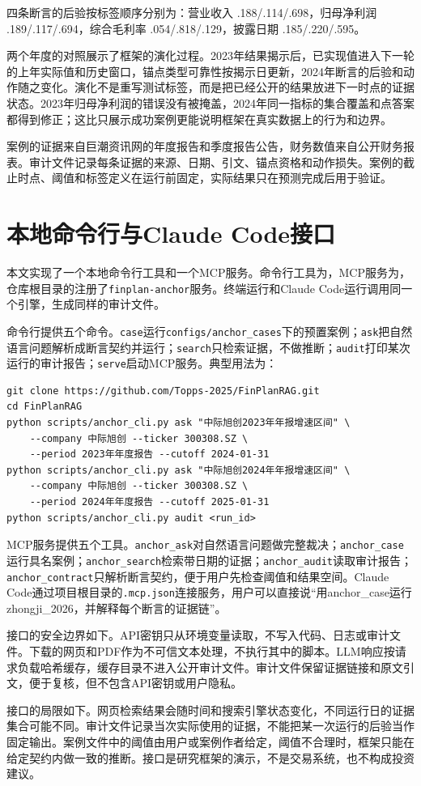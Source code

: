 {\sloppy 四条断言的后验按标签顺序分别为：营业收入 .188/.114/.698，归母净利润 .189/.117/.694，综合毛利率 .054/.818/.129，披露日期 .185/.220/.595。\par}

两个年度的对照展示了框架的演化过程。2023年结果揭示后，已实现值进入下一轮的上年实际值和历史窗口，锚点类型可靠性按揭示日更新，2024年断言的后验和动作随之变化。演化不是重写测试标签，而是把已经公开的结果放进下一时点的证据状态。2023年归母净利润的错误没有被掩盖，2024年同一指标的集合覆盖和点答案都得到修正；这比只展示成功案例更能说明框架在真实数据上的行为和边界。

案例的证据来自巨潮资讯网的年度报告和季度报告公告，财务数值来自公开财务报表。审计文件记录每条证据的来源、日期、引文、锚点资格和动作损失。案例的截止时点、阈值和标签定义在运行前固定，实际结果只在预测完成后用于验证。

\chapter{本地命令行与Claude Code接口}
\label{app:cli}

{\sloppy 本文实现了一个本地命令行工具和一个MCP服务。命令行工具为，MCP服务为，仓库根目录的注册了\texttt{finplan-anchor}服务。终端运行和Claude Code运行调用同一个引擎，生成同样的审计文件。\par}

命令行提供五个命令。\texttt{case}运行\texttt{configs/anchor\_cases}下的预置案例；\texttt{ask}把自然语言问题解析成断言契约并运行；\texttt{search}只检索证据，不做推断；\texttt{audit}打印某次运行的审计报告；\texttt{serve}启动MCP服务。典型用法为：

\begin{lstlisting}
git clone https://github.com/Topps-2025/FinPlanRAG.git
cd FinPlanRAG
python scripts/anchor_cli.py ask "中际旭创2023年年报增速区间" \
    --company 中际旭创 --ticker 300308.SZ \
    --period 2023年年度报告 --cutoff 2024-01-31
python scripts/anchor_cli.py ask "中际旭创2024年年报增速区间" \
    --company 中际旭创 --ticker 300308.SZ \
    --period 2024年年度报告 --cutoff 2025-01-31
python scripts/anchor_cli.py audit <run_id>
\end{lstlisting}

{\sloppy
MCP服务提供五个工具。\texttt{anchor\_ask}对自然语言问题做完整裁决；\texttt{anchor\_case}运行具名案例；\texttt{anchor\_search}检索带日期的证据；\texttt{anchor\_audit}读取审计报告；\texttt{anchor\_contract}只解析断言契约，便于用户先检查阈值和结果空间。Claude Code通过项目根目录的\texttt{.mcp.json}连接服务，用户可以直接说“用anchor\_case运行zhongji\_2026，并解释每个断言的证据链”。\par
}

接口的安全边界如下。API密钥只从环境变量读取，不写入代码、日志或审计文件。下载的网页和PDF作为不可信文本处理，不执行其中的脚本。LLM响应按请求负载哈希缓存，缓存目录不进入公开审计文件。审计文件保留证据链接和原文引文，便于复核，但不包含API密钥或用户隐私。

接口的局限如下。网页检索结果会随时间和搜索引擎状态变化，不同运行日的证据集合可能不同。审计文件记录当次实际使用的证据，不能把某一次运行的后验当作固定输出。案例文件中的阈值由用户或案例作者给定，阈值不合理时，框架只能在给定契约内做一致的推断。接口是研究框架的演示，不是交易系统，也不构成投资建议。
